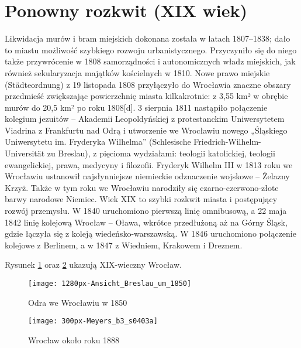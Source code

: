 \documentclass{article}
\begin{document}
\section*{Ponowny rozkwit (XIX wiek)}
Likwidacja murów i bram miejskich dokonana została w latach 1807–1838; dało to miastu możliwość szybkiego rozwoju urbanistycznego. Przyczyniło się do niego także przywrócenie w 1808 samorządności i autonomicznych władz miejskich, jak również sekularyzacja majątków kościelnych w 1810. Nowe prawo miejskie (Städteordnung) z 19 listopada 1808 przyłączyło do Wrocławia znaczne obszary przedmieść zwiększając powierzchnię miasta kilkakrotnie: z 3,55 km² w obrębie murów do 20,5 km² po roku 1808[d]. 3 sierpnia 1811 nastąpiło połączenie kolegium jezuitów – Akademii Leopoldyńskiej z protestanckim Uniwersytetem Viadrina z Frankfurtu nad Odrą i utworzenie we Wrocławiu nowego „Śląskiego Uniwersytetu im. Fryderyka Wilhelma” (Schlesische Friedrich-Wilhelm-Universität zu Breslau), z pięcioma wydziałami: teologii katolickiej, teologii ewangelickiej, prawa, medycyny i filozofii. Fryderyk Wilhelm III w 1813 roku we Wrocławiu ustanowił najsłynniejsze niemieckie odznaczenie wojskowe – Żelazny Krzyż. Także w tym roku we Wrocławiu narodziły się czarno-czerwono-złote barwy narodowe Niemiec. Wiek XIX to szybki rozkwit miasta i postępujący rozwój przemysłu. W 1840 uruchomiono pierwszą linię omnibusową, a 22 maja 1842 linię kolejową Wrocław – Oława, wkrótce przedłużoną aż na Górny Śląsk, gdzie łączyła się z koleją wiedeńsko-warszawską. W 1846 uruchomiono połączenie kolejowe z Berlinem, a w 1847 z Wiedniem, Krakowem i Dreznem.

\vspace{6pt}

\noindent Rysunek \ref{rysunek8} oraz \ref{rysunek9} ukazują XIX-wieczny Wrocław.

\begin{figure}[h]
\centering

\texttt{[image: 1280px-Ansicht\_Breslau\_um\_1850]}
\caption{Odra we Wrocławiu w 1850}
\label{rysunek8}

\end{figure}

\begin{figure}[h]
\centering

\texttt{[image: 300px-Meyers\_b3\_s0403a]}
\caption{Wrocław około roku 1888}
\label{rysunek9}
\end{figure}
\end{document}
